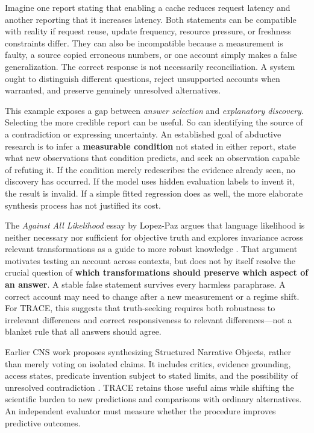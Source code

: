 \documentclass[11pt,a4paper]{article}
\begin{document}
Imagine one report stating that enabling a cache reduces request latency
and another reporting that it increases latency. Both statements can be
compatible with reality if request reuse, update frequency, resource
pressure, or freshness constraints differ. They can also be incompatible
because a measurement is faulty, a source copied erroneous numbers, or
one account simply makes a false generalization. The correct response is
not necessarily reconciliation. A system ought to distinguish different
questions, reject unsupported accounts when warranted, and preserve
genuinely unresolved alternatives.

This example exposes a gap between \emph{answer selection} and
\emph{explanatory discovery}. Selecting the more credible report can be
useful. So can identifying the source of a contradiction or expressing
uncertainty. An established goal of abductive research is to infer a
\textbf{measurable condition} not stated in either report, state what
new observations that condition predicts, and seek an observation
capable of refuting it. If the condition merely redescribes the evidence
already seen, no discovery has occurred. If the model uses hidden
evaluation labels to invent it, the result is invalid. If a simple
fitted regression does as well, the more elaborate synthesis process has
not justified its cost.

The \emph{Against All Likelihood} essay by Lopez-Paz argues that
language likelihood is neither necessary nor sufficient for objective
truth and explores invariance across relevant transformations as a guide
to more robust knowledge \citep{R01}. That argument motivates testing an
account across contexts, but does not by itself resolve the crucial
question of \textbf{which transformations should preserve which aspect
of an answer}. A stable false statement survives every harmless
paraphrase. A correct account may need to change after a new measurement
or a regime shift. For TRACE, this suggests that truth-seeking requires
both robustness to irrelevant differences and correct responsiveness to
relevant differences---not a blanket rule that all answers should agree.

Earlier CNS work proposes synthesizing Structured Narrative Objects,
rather than merely voting on isolated claims. It includes critics,
evidence grounding, access states, predicate invention subject to stated
limits, and the possibility of unresolved contradiction
\citep{G02, G03, G11}. TRACE retains those useful aims while shifting
the scientific burden to new predictions and comparisons with ordinary
alternatives. An independent evaluator must measure whether the
procedure improves predictive outcomes.
\end{document}
